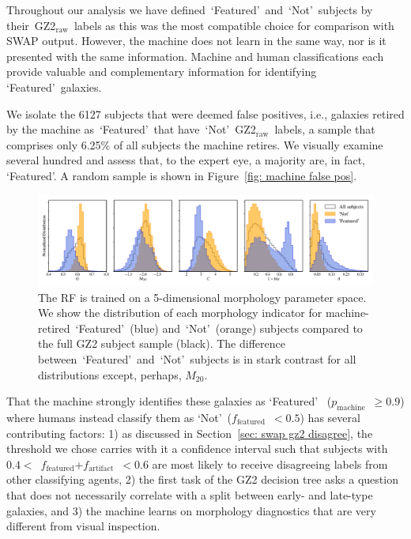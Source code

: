 \documentclass[twocolumn,  trackchanges, ]{aastex6}%
\newcommand{\M}[1]{$M_{\mathrm{#1}}$}
\newcommand{\feat}{`Featured'}
\newcommand{\notfeat}{`Not'}
\newcommand{\raw}{GZ2$_{\text{raw}}$}
\newcommand{\pmachine}{$p_{\mathrm{machine}}$}
\newcommand{\ffeat}{$f_{\mathrm{featured}}$}
\newcommand{\fstar}{$f_{\mathrm{artifact}}$}
\begin{document}
Throughout our analysis we have defined~\feat~and~\notfeat~subjects by 
their~\raw~labels as this was the most compatible choice for comparison with SWAP output.  
However, the machine does not learn in the same way, nor is it presented with the 
same information. Machine and human classifications 
each provide valuable and complementary information for identifying \feat~galaxies.

We isolate the 6127 subjects that were deemed false positives, i.e., galaxies 
retired by the machine as~\feat~that have~\notfeat~\raw~labels, a sample that
comprises only 6.25\% of all subjects the machine retires.
We visually examine several hundred
and assess that, to the expert eye, a majority are, in fact, \feat.  
A random sample is shown in Figure~\ref{fig: machine false pos}. 

\begin{figure}[t!]
\centering
\includegraphics[width=7in]{f13.pdf}
\caption{The RF is trained on a 5-dimensional morphology parameter space. We show the distribution of each morphology indicator for machine-retired~\feat~(blue) and~\notfeat~(orange) subjects compared to the full GZ2 subject sample (black). The difference between~\feat~and~\notfeat~subjects is in stark contrast for all distributions except, perhaps, \M{20}.  \label{fig: morph params}}
\end{figure}



That the machine strongly identifies these galaxies as \feat~
(\pmachine~$\ge 0.9$) where humans instead classify them as \notfeat~(\ffeat~$< 0.5$) 
has several contributing factors: 1) as discussed in Section~\ref{sec: swap gz2 disagree}, 
the threshold we chose carries with it a confidence interval such that subjects with 
$0.4 <$~\ffeat+\fstar~$< 0.6$ are most likely to receive disagreeing labels from 
other classifying agents, 2) the first task of the GZ2 decision tree asks a 
question that does not necessarily correlate with a split between early- and
 late-type galaxies, and 3) the machine learns on morphology diagnostics
 that are very different from visual inspection.
\end{document}
